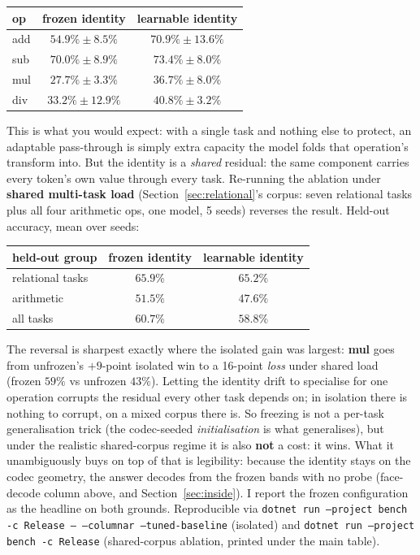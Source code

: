 \documentclass[11pt]{article}
\newcommand{\code}[1]{\texttt{#1}}
\begin{document}
\begin{center}
\begin{tabular}{@{}lcc@{}}
\toprule
op & frozen identity & learnable identity \\
\midrule
add & $54.9\% \pm 8.5\%$  & $\mathbf{70.9\% \pm 13.6\%}$ \\
sub & $70.0\% \pm 8.9\%$  & $\mathbf{73.4\% \pm 8.0\%}$ \\
mul & $27.7\% \pm 3.3\%$  & $\mathbf{36.7\% \pm 8.0\%}$ \\
div & $33.2\% \pm 12.9\%$ & $\mathbf{40.8\% \pm 3.2\%}$ \\
\bottomrule
\end{tabular}
\end{center}

This is what you would expect: with a single task and nothing else to protect, an adaptable
pass-through is simply extra capacity the model folds that operation's transform into. But the identity
is a \emph{shared} residual: the same component carries every token's own value through every task.
Re-running the ablation under \textbf{shared multi-task load} (Section~\ref{sec:relational}'s corpus:
seven relational tasks plus all four arithmetic ops, one model, 5 seeds) reverses the result. Held-out
accuracy, mean over seeds:

\begin{center}
\begin{tabular}{@{}lcc@{}}
\toprule
held-out group & frozen identity & learnable identity \\
\midrule
relational tasks & $\mathbf{65.9\%}$ & $65.2\%$ \\
arithmetic       & $\mathbf{51.5\%}$ & $47.6\%$ \\
all tasks        & $\mathbf{60.7\%}$ & $58.8\%$ \\
\bottomrule
\end{tabular}
\end{center}

The reversal is sharpest exactly where the isolated gain was largest: \textbf{mul} goes from unfrozen's
$+9$-point isolated win to a 16-point \emph{loss} under shared load (frozen $59\%$ vs unfrozen $43\%$).
Letting the identity drift to specialise for one operation corrupts the residual every other task
depends on; in isolation there is nothing to corrupt, on a mixed corpus there is. So freezing is not a
per-task generalisation trick (the codec-seeded \emph{initialisation} is what generalises), but under
the realistic shared-corpus regime it is also \textbf{not} a cost: it wins. What it unambiguously buys
on top of that is legibility: because the identity stays on the codec geometry, the answer decodes from
the frozen bands with no probe (face-decode column above, and Section~\ref{sec:inside}). I report the
frozen configuration as the headline on both grounds. Reproducible via
\code{dotnet run --project bench -c Release -- --columnar --tuned-baseline} (isolated) and
\code{dotnet run --project bench -c Release} (shared-corpus ablation, printed under the main table).
\end{document}
